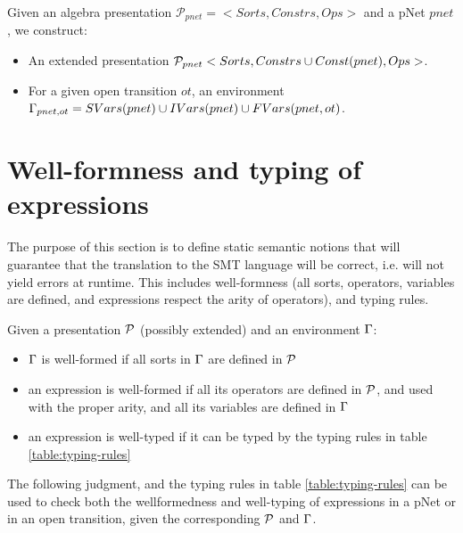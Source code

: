 \documentclass{lncs/llncs}
\newcommand{\TODO}[1]{\textcolor{red}{\textbf{[TODO:#1]}}}
\begin{document}
\begin{definition}
  Given an algebra presentation $\mathcal{P}_{pnet}=<Sorts,Constrs,Ops>$ and a pNet $pnet$, we
  construct:
  \begin{itemize}
  \item An extended presentation $\mathcal{P}_{pnet}<Sorts,Constrs \cup Const(pnet),Ops>$.
  \item For a given open transition $ot$, an environment
    $\Gamma_{pnet,ot}=SVars(pnet) \cup IVars(pnet) \cup FVars(pnet,ot)$. 
  \end{itemize} 
\end{definition}



\section{Well-formness and typing of expressions}

The purpose of this section is to define static semantic notions that
will guarantee that the translation to the SMT language will be
correct, i.e. will not yield errors at runtime. This includes
well-formness (all sorts, operators, variables are defined, and
expressions respect the arity of operators), and typing rules.

\begin{definition}
  Given a presentation $\mathcal{P}$ (possibly extended) and an environment $\Gamma$:
  \begin{itemize}
  \item $\Gamma$ is well-formed if all sorts in $\Gamma$ are
    defined in $\mathcal{P}$
  \item an expression is well-formed if all its operators are defined
    in $\mathcal{P}$, and used with the proper arity, and all its
    variables are defined in $\Gamma$
  \item an expression is well-typed if it can be typed by the typing
    rules in table \ref{table:typing-rules}
  \end{itemize}
\end{definition}

The following judgment, and the typing rules in table
\ref{table:typing-rules} can be used to check both the wellformedness
and well-typing of expressions in a pNet or in an open transition,
given the corresponding $\mathcal{P}$ and $\Gamma$.
\end{document}
